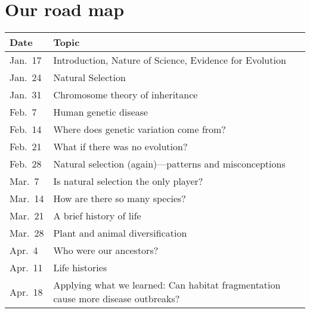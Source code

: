 \section{Our road map}

\noindent\begin{tabular}{ p{0.8in} p{5.0in} }
    \hline
    \textbf{Date} & \textbf{Topic} \\
    \hline
    Jan.\ 17 & Introduction, Nature of Science, Evidence for Evolution \\
    Jan.\ 24 & Natural Selection \\
    Jan.\ 31 & Chromosome theory of inheritance \\
    Feb.\ 7  & Human genetic disease \\
    Feb.\ 14 & Where does genetic variation come from? \\
    Feb.\ 21 & What if there was no evolution? \\
    Feb.\ 28 & Natural selection (again)---patterns and misconceptions \\
    Mar.\ 7  & Is natural selection the only player? \\
    Mar.\ 14 & How are there so many species? \\
    Mar.\ 21 & A brief history of life \\
    Mar.\ 28 & Plant and animal diversification \\
    Apr.\ 4  & Who were our ancestors? \\
    Apr.\ 11 & Life histories \\
    Apr.\ 18 & Applying what we learned: Can habitat fragmentation cause more
                disease outbreaks? \\
    \hline
\end{tabular}


